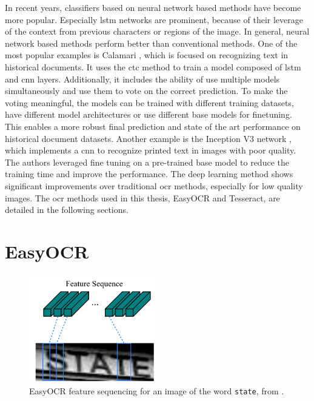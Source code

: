 In recent years, classifiers based on neural network based methods \cite{ocr_survey_lstms_2013} have become more popular.
Especially \gls{lstm} networks are prominent, because of their leverage of the context from previous characters or regions of the image.
In general, neural network based methods perform better than conventional methods.
One of the most popular examples is Calamari \cite{ocr_calamari_2018}, which is focused on recognizing text in historical documents.
It uses the \gls{ctc} method to train a model composed of \gls{lstm} and \gls{cnn} layers.
Additionally, it includes the ability of use multiple models simultaneously and use them to vote on the correct prediction.
To make the voting meaningful, the models can be trained with different training datasets, have different model architectures or use different base models for finetuning.
This enables a more robust final prediction and state of the art performance on historical document datasets.
Another example is the Inception V3 network \cite{ocr_improved_deep_2018}, which implements a \gls{cnn} to recognize printed text in images with poor quality.
The authors leveraged fine tuning on a pre-trained base model to reduce the training time and improve the performance.
The deep learning method shows significant improvements over traditional \gls{ocr} methods, especially for low quality images.
The \gls{ocr} methods used in this thesis, EasyOCR and Tesseract, are detailed in the following sections.

\section{EasyOCR}
\label{subsec:easyocr}

\begin{figure}[h!]
    \centering
    \includegraphics[width=0.5\textwidth]{../images/external/crnn_features.png}
    \caption{EasyOCR feature sequencing for an image of the word \texttt{state}, from \cite{crnn_2015}.}
    \label{fig:easyocr_features}
\end{figure}

